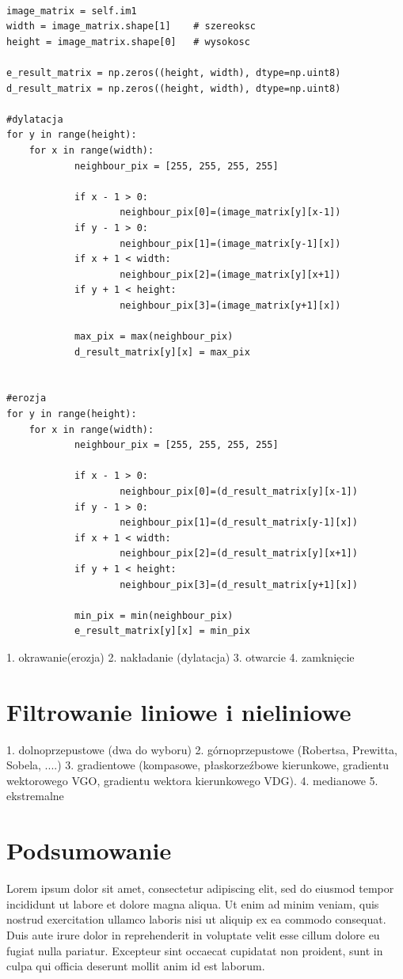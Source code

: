 \documentclass[final,a4paper,openany,12pt]{mwbk}
\begin{document}
\begin{lstlisting}[caption= Operacja zamknięcia na obrazie szarym]

image_matrix = self.im1
width = image_matrix.shape[1]    # szereoksc
height = image_matrix.shape[0]   # wysokosc

e_result_matrix = np.zeros((height, width), dtype=np.uint8)
d_result_matrix = np.zeros((height, width), dtype=np.uint8)

#dylatacja
for y in range(height):
    for x in range(width):  
            neighbour_pix = [255, 255, 255, 255]

            if x - 1 > 0:
                    neighbour_pix[0]=(image_matrix[y][x-1])
            if y - 1 > 0:
                    neighbour_pix[1]=(image_matrix[y-1][x])
            if x + 1 < width:
                    neighbour_pix[2]=(image_matrix[y][x+1])
            if y + 1 < height:
                    neighbour_pix[3]=(image_matrix[y+1][x])

            max_pix = max(neighbour_pix)
            d_result_matrix[y][x] = max_pix   


#erozja
for y in range(height):
    for x in range(width):  
            neighbour_pix = [255, 255, 255, 255]

            if x - 1 > 0:
                    neighbour_pix[0]=(d_result_matrix[y][x-1])
            if y - 1 > 0:
                    neighbour_pix[1]=(d_result_matrix[y-1][x])
            if x + 1 < width:
                    neighbour_pix[2]=(d_result_matrix[y][x+1])
            if y + 1 < height:
                    neighbour_pix[3]=(d_result_matrix[y+1][x])

            min_pix = min(neighbour_pix)
            e_result_matrix[y][x] = min_pix     

\end{lstlisting}



1. okrawanie(erozja)
2. nakładanie (dylatacja)
3. otwarcie
4. zamknięcie

\chapter {Filtrowanie liniowe i nieliniowe}
1. dolnoprzepustowe (dwa do wyboru)
2. górnoprzepustowe (Robertsa, Prewitta, Sobela, ....)
3. gradientowe (kompasowe, płaskorzeźbowe kierunkowe, gradientu wektorowego VGO, gradientu
wektora kierunkowego VDG).
4. medianowe
5. ekstremalne

\chapter{Podsumowanie}

Lorem ipsum dolor sit amet, consectetur adipiscing elit, sed do eiusmod tempor incididunt ut labore et dolore magna aliqua. Ut enim ad minim veniam, quis nostrud exercitation ullamco laboris nisi ut aliquip ex ea commodo consequat. Duis aute irure dolor in reprehenderit in voluptate velit esse cillum dolore eu fugiat nulla pariatur. Excepteur sint occaecat cupidatat non proident, sunt in culpa qui officia deserunt mollit anim id est laborum.



\end{document}
